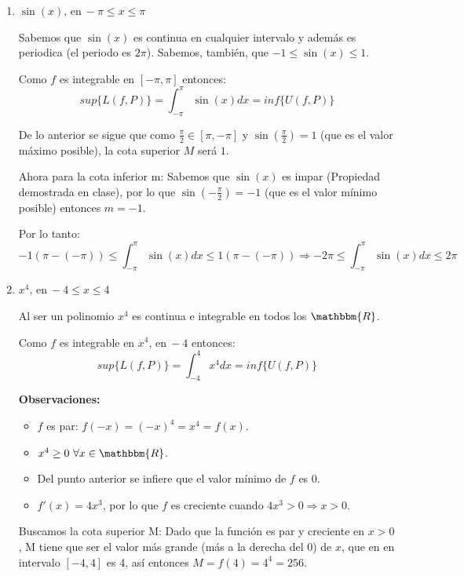 \documentclass[12pt]{article}
\begin{document}
\begin{enumerate}[\hspace{9px} a)]
    \item \(\sin(x) \text{, en} \ -\pi \leq x \leq \pi\)\bigskip

        Sabemos que $\sin(x)$ es continua en cualquier intervalo y además es periodica (el periodo es $2\pi$). Sabemos, tambi\'en, que $-1\leq \sin(x)\leq 1$.\bigskip
        
        Como $f$ es integrable en $[-\pi,\pi]$ entonces: \[sup\{L(f,P)\}=\displaystyle\int_{-\pi}^{\pi}\sin(x)dx=inf\{U(f,P)\}\]
        
        De lo anterior se sigue que como \(\displaystyle\frac{\pi}{2}\in[\pi,-\pi]\) y $\sin\left(\displaystyle\frac{\pi}{2}\right)=1$ (que es el valor m\'aximo posible), la cota superior $M$ será $1$.\bigskip
        
        Ahora para la cota inferior m: Sabemos que $\sin(x)$ es impar (Propiedad demostrada en clase), por lo que \(\sin\left(-\displaystyle\frac{\pi}{2}\right)=-1\) (que  es el valor m\'inimo posible) entonces $m=-1$.\bigskip

        Por lo tanto: 
        \[-1(\pi-(-\pi)) \leq \int_{-\pi}^{\pi}\sin(x)dx \leq 1(\pi-(-\pi)) \Rightarrow -2\pi \leq \int_{-\pi}^{\pi}\sin(x)dx \leq 2\pi\]

    \item \(x^4 \text{, en} \ -4 \leq x \leq 4\)\bigskip

        Al ser un polinomio $x^4$ es continua e integrable en todos los $\mathbbm{R}$.\bigskip

        Como $f$ es integrable en \(x^4 \text{, en} \ -4\) entonces:  \[sup\{L(f,P)\}=\displaystyle\int_{-4}^{4}x^4dx=inf\{U(f,P)\}\]

        \textbf{Observaciones:}
        \begin{itemize}
            \item $f$ es par: \(f(-x)=(-x)^4=x^4=f(x)\).
            \item \(x^4\geq0 \ \forall x\in \mathbbm{R}\).
            \item Del punto anterior se infiere que el valor m\'inimo de $f$ es 0.
            \item \(f'(x) = 4x^3\), por lo que $f$ es creciente cuando \(4x^3>0 \Rightarrow x>0\).
        \end{itemize}


        Buscamos la cota superior M: Dado que la funci\'on es par y creciente en $x>0$, M tiene que ser el valor m\'as grande (m\'as a la derecha del 0) de $x$, que en en intervalo \([-4,4]\) es 4, as\'i entonces \(M = f(4) = 4^4 = 256\).


\end{enumerate}
\end{document}
